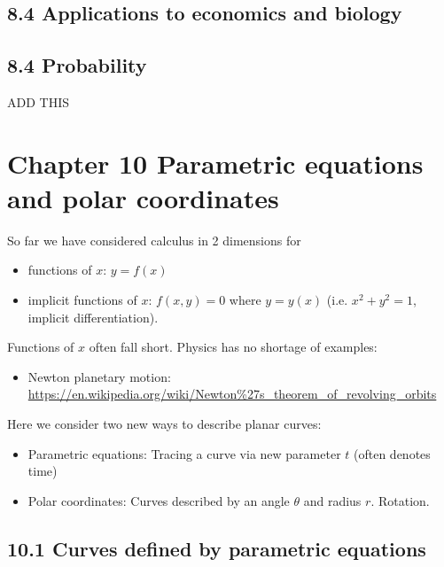 \documentclass{article}
\begin{document}
\subsection{8.4 Applications to economics and biology}

\subsection{8.4 Probability}

ADD THIS


\section{Chapter 10 Parametric equations and polar coordinates}

So far we have considered calculus in 2 dimensions for 
\begin{itemize}
\item functions of $x$: $y=f(x)$
\item implicit functions of $x$: $f(x,y)=0$ where $y=y(x)$ (i.e. $x^2+y^2=1$, implicit differentiation). 
\end{itemize}
Functions of $x$ often fall short. Physics has no shortage of examples:
\begin{itemize}
\item Newton planetary motion: \url{https://en.wikipedia.org/wiki/Newton%27s_theorem_of_revolving_orbits}
\end{itemize}
Here we consider two new ways to describe planar curves:
\begin{itemize}
\item Parametric equations: Tracing a curve via new parameter $t$ (often denotes time)
\item Polar coordinates: Curves described by an angle $\theta$ and radius $r$. Rotation.
\end{itemize}

\subsection{10.1 Curves defined by parametric equations}
\end{document}
